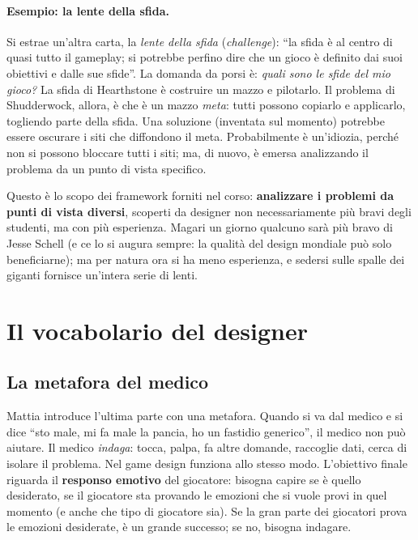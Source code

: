\paragraph{Esempio: la lente della sfida.} Si estrae un'altra carta, la
\emph{lente della sfida} (\emph{challenge}): ``la sfida è al centro di quasi
tutto il gameplay; si potrebbe perfino dire che un gioco è definito dai suoi
obiettivi e dalle sue sfide''. La domanda da porsi è: \emph{quali sono le
sfide del mio gioco?} La sfida di Hearthstone è costruire un mazzo e
pilotarlo. Il problema di Shudderwock, allora, è che è un mazzo \emph{meta}:
tutti possono copiarlo e applicarlo, togliendo parte della sfida. Una
soluzione (inventata sul momento) potrebbe essere oscurare i siti che
diffondono il meta. Probabilmente è un'idiozia, perché non si possono bloccare
tutti i siti; ma, di nuovo, è emersa analizzando il problema da un punto di
vista specifico.

Questo è lo scopo dei framework forniti nel corso: \textbf{analizzare i
problemi da punti di vista diversi}, scoperti da designer non necessariamente
più bravi degli studenti, ma con più esperienza. Magari un giorno qualcuno
sarà più bravo di Jesse Schell (e ce lo si augura sempre: la qualità del
design mondiale può solo beneficiarne); ma per natura ora si ha meno
esperienza, e sedersi sulle spalle dei giganti fornisce un'intera serie di
lenti.

\section{Il vocabolario del designer}
\label{sec:vocabolario}

\subsection{La metafora del medico}

Mattia introduce l'ultima parte con una metafora. Quando si va dal medico e si
dice ``sto male, mi fa male la pancia, ho un fastidio generico'', il medico non
può aiutare. Il medico \emph{indaga}: tocca, palpa, fa altre domande,
raccoglie dati, cerca di isolare il problema. Nel game design funziona allo
stesso modo. L'obiettivo finale riguarda il \textbf{responso emotivo} del
giocatore: bisogna capire se è quello desiderato, se il giocatore sta provando
le emozioni che si vuole provi in quel momento (e anche che tipo di giocatore
sia). Se la gran parte dei giocatori prova le emozioni desiderate, è un grande
successo; se no, bisogna indagare.

